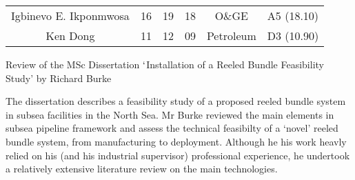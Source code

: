\documentclass[14pt,twoside]{report}
\begin{document}
{\begin{landscape}
\begin{tabular}{||c| c c c |c| c||}
Igbinevo E. Ikponmwosa     &         16                      &           19                          &          18                &    O$\&$GE       &    A5 (18.10)   \\
Ken Dong                   &         11                      &           12                          &          09                &    Petroleum     &    D3 (10.90)   \\
\hline\hline
\end{tabular}
    \end{landscape}
    \clearpage%
}


\clearpage

\vfill 




\bigskip

\begin{center}
{\Large Review of the MSc Dissertation $\lq$Installation of a Reeled Bundle Feasibility Study' by Richard Burke}
\end{center}

\medskip

The dissertation describes a feasibility study of a proposed reeled bundle system in subsea facilities in the North Sea. Mr Burke reviewed the main elements in subsea pipeline framework and assess the technical feasibilty of a `novel' reeled bundle system, from manufacturing to deployment. Although he his work heavly relied on his (and his industrial supervisor) professional experience, he undertook a relatively extensive literature review on the main technologies.
\end{document}
